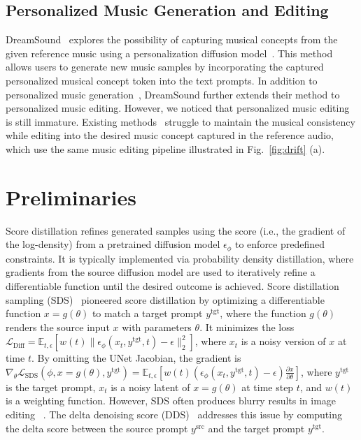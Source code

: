 \subsection{Personalized Music Generation and Editing}
DreamSound~\cite{plitsis2024investigating} explores the possibility of capturing musical concepts from the given reference music using a personalization diffusion model~\cite{ruiz2023dreambooth,gal2022image,kumari2023multi}. This method allows users to generate new music samples by incorporating the captured personalized musical concept token into the text prompts.
In addition to personalized music generation~\cite{plitsis2024investigating,chen2024jen},
DreamSound further extends their method to personalized music editing.
However, we noticed that personalized music editing is still immature.
Existing methods~\cite{plitsis2024investigating} struggle to maintain the musical consistency while editing into the desired music concept captured in the reference audio, which use the same music editing pipeline illustrated in Fig.~\ref{fig:drift} (a).

\section{Preliminaries}

Score distillation refines generated samples using the score (i.e., the gradient of the log-density) from a pretrained diffusion model $\epsilon_\phi$ to enforce predefined constraints. It is typically implemented via probability density distillation, where gradients from the source diffusion model are used to iteratively refine a differentiable function until the desired outcome is achieved.
Score distillation sampling (SDS)~\cite{poole2022dreamfusion} pioneered score distillation by optimizing a differentiable function $x = g(\theta)$ to match a target prompt $y^{\text{tgt}}$, where the function $g(\theta)$ renders the source input $x$ with parameters $\theta$. It minimizes the loss
$\mathcal{L}_{\text{Diff}} = \mathbb{E}_{t,\epsilon}[ w(t) \| \epsilon_\phi (x_t, y^{\text{tgt}},t) - \epsilon \|_2^2]$, where $x_t$ is a noisy version of $x$ at time $t$. By omitting the UNet Jacobian, the gradient is
$
    \nabla_\theta \mathcal{L}_{\text{SDS}}(\phi,x=g(\theta),y^{\text{tgt}}) 
     =\mathbb{E}_{t,\epsilon}[w(t)(\epsilon_\phi(x_t,y^{\text{tgt}},t) -\epsilon)\frac{\partial x}{\partial \theta}] \label{eqn:sds}
$,
where $y^{\text{tgt}}$ is the target prompt, $x_t$
is a noisy latent of $x = g(\theta)$ at time step $t$, and $w(t)$ is a weighting function. However, SDS often produces blurry results in image editing
~\cite{wang2023prolificdreamer,hertz2023delta}. The delta denoising score (DDS)~\cite{hertz2023delta} addresses this issue by computing the delta score between the source prompt $y^{\text{src}}$ and the target prompt $y^{\text{tgt}}$. 

